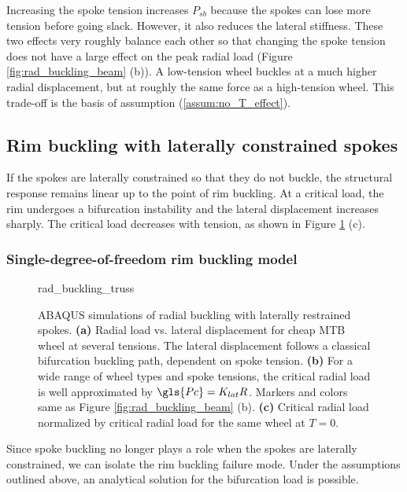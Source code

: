 \documentclass[\rootdir/thesis.tex]{subfiles}
\begin{document}
Increasing the spoke tension increases $P_{sb}$ because the spokes can lose more tension before going slack. However, it also reduces the lateral stiffness. These two effects very roughly balance each other so that changing the spoke tension does not have a large effect on the peak radial load (Figure \ref{fig:rad_buckling_beam} (b)). A low-tension wheel buckles at a much higher radial displacement, but at roughly the same force as a high-tension wheel. This trade-off is the basis of assumption (\ref{assum:no_T_effect}).

\subsection{Rim buckling with laterally constrained spokes}

If the spokes are laterally constrained so that they do not buckle, the structural response remains linear up to the point of rim buckling. At a critical load, the rim undergoes a bifurcation instability and the lateral displacement increases sharply. The critical load decreases with tension, as shown in Figure \ref{fig:rad_buckling_truss} (c).

\subsubsection{Single-degree-of-freedom rim buckling model}

\begin{figure}[t]
\centering
{rad_buckling_truss} 
\caption{ABAQUS simulations of radial buckling with laterally restrained spokes. \textbf{(a)} Radial load vs. lateral displacement for cheap MTB wheel at several tensions. The lateral displacement follows a classical bifurcation buckling path, dependent on spoke tension. \textbf{(b)} For a wide range of wheel types and spoke tensions, the critical radial load is well approximated by $\gls{Pc} = K_{lat}R$. Markers and colors same as Figure \ref{fig:rad_buckling_beam} (b). \textbf{(c)} Critical radial load normalized by critical radial load for the same wheel at $T=0$.}
\label{fig:rad_buckling_truss}
\end{figure}

Since spoke buckling no longer plays a role when the spokes are laterally constrained, we can isolate the rim buckling failure mode. Under the assumptions outlined above, an analytical solution for the bifurcation load is possible.
\end{document}
